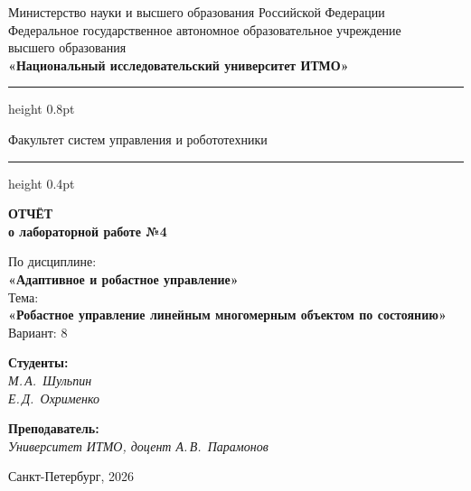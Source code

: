 \documentclass[a4paper,12pt]{article}
\begin{document}
	
	\begin{titlepage}
		\centering
		
		\vspace*{0.5cm}
		{\small
			Министерство науки и высшего образования Российской Федерации\\[2pt]
			Федеральное государственное автономное образовательное учреждение\\
			высшего образования\\[2pt]
			\textbf{«Национальный исследовательский университет ИТМО»}\\
		}
		
		\vspace{0.8cm}
		\hrule height 0.8pt
		\vspace{0.3cm}
		
		{\large Факультет систем управления и робототехники}
		
		\vspace{0.3cm}
		\hrule height 0.4pt
		\vspace{2.5cm}
		
		{\Huge\bfseries ОТЧЁТ}\\[0.4cm]
		{\LARGE\bfseries о лабораторной работе №4}\\[0.8cm]
		
		\begin{tcolorbox}[
			colback=gray!4,
			colframe=gray!10,
			boxrule=0.8pt,
			arc=4pt,
			left=12pt, right=12pt, top=8pt, bottom=8pt
			]
			\centering
			{\large По дисциплине:\\[4pt]}
			{\large\bfseries «Адаптивное и робастное управление»}\\[10pt]
			{\large Тема:\\[4pt]}
			{\large\bfseries «Робастное управление линейным многомерным объектом по состоянию»} \\[10pt]
			{\large Вариант: 8}
		\end{tcolorbox}
\vspace{3cm}


	\begin{minipage}{0.45\textwidth}
		\raggedright
		{\large\bfseries Студенты:}\\[4pt]
		\textit{М.\,А.~Шульпин}\\
		\textit{Е.\,Д.~Охрименко}
	\end{minipage}%
	\hfill
	\begin{minipage}{0.45\textwidth}
		\raggedleft
		{\large\bfseries Преподаватель:}\\[4pt]
		\textit{Университет ИТМО, доцент \hfill А.\,В.~Парамонов}
	\end{minipage}
		
		\vfill
		\vspace{0.4cm}
		{\large Санкт-Петербург, 2026}
	\end{titlepage}
	
\end{document}
